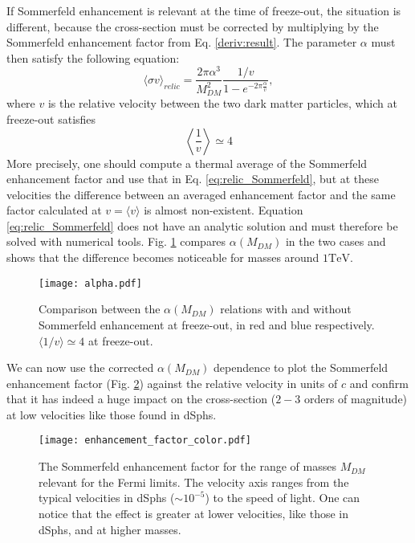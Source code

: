 If Sommerfeld enhancement is relevant at the time of freeze-out, the situation is different, because the cross-section must be corrected by multiplying by the Sommerfeld enhancement factor from Eq. \eqref{deriv:result}. The parameter \(\alpha \) must then satisfy the following equation:
\begin{equation}\label{eq:relic_Sommerfeld}
	\langle \sigma v \rangle _{relic} = \frac{2\pi \alpha ^3}{M_{DM} ^2} \frac{1 / v}{1- e^{-2\pi \frac{\alpha}{v}}},
\end{equation}
where \(v\) is the relative velocity between the two dark matter particles, which at freeze-out satisfies
\begin{equation}
	\left \langle \frac{1}{v} \right \rangle \simeq 4
\end{equation}
More precisely, one should compute a thermal average of the Sommerfeld enhancement factor and use that in Eq. \eqref{eq:relic_Sommerfeld}, but at these velocities the difference between an averaged enhancement factor and the same factor calculated at \(v= \langle v \rangle \) is almost non-existent. Equation \eqref{eq:relic_Sommerfeld} does not have an analytic solution and must therefore be solved with numerical tools. Fig. \ref{fig:alpha} compares \(\alpha (M_{DM} )\) in the two cases and shows that the difference becomes noticeable for masses around \(1 \mathrm{TeV} \).

\begin{figure}[htbp]
	\centering
	\texttt{[image: alpha.pdf]}
	\caption{Comparison between the \(\alpha (M_{DM} )\) relations with and without Sommerfeld enhancement at freeze-out, in red and blue respectively. \(\langle 1 / v \rangle \simeq 4 \) at freeze-out.}
	\label{fig:alpha}
\end{figure}

We can now use the corrected \(\alpha (M_{DM} )\) dependence to plot the Sommerfeld enhancement factor (Fig. \ref{fig:enhancement_factor}) against the relative velocity in units of \(c\) and confirm that it has indeed a huge impact on the cross-section (\(2-3\) orders of magnitude) at low velocities like those found in dSphs.

\begin{figure}[htbp]
	\centering
	\texttt{[image: enhancement\_factor\_color.pdf]}
	\caption{The Sommerfeld enhancement factor for the range of masses \(M_{DM} \) relevant for the Fermi limits. The velocity axis ranges from the typical velocities in dSphs (\(\sim 10^{-5} \)) to the speed of light. One can notice that the effect is greater at lower velocities, like those in dSphs, and at higher masses.}
	\label{fig:enhancement_factor}
\end{figure}

